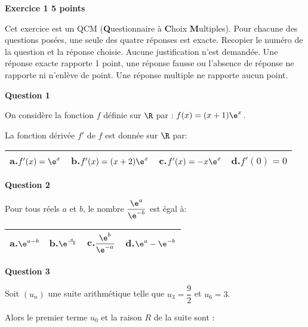 \textbf{\large Exercice 1 \hfill 5 points}

\bigskip

Cet exercice est un QCM (\textbf{Q}uestionnaire à \textbf{C}hoix \textbf{M}ultiples). Pour chacune des questions posées, une seule des quatre réponses est exacte. Recopier le numéro de la question et la réponse choisie. Aucune justification n'est demandée. Une réponse exacte rapporte 1 point, une réponse fausse ou l'absence de réponse ne rapporte ni n'enlève de point. Une réponse multiple ne rapporte aucun point.

\bigskip

\textbf{Question 1}

\medskip

On considère la fonction $f$ définie sur $\R$ par : $f(x)= (x+1)\e^{x}$.

La fonction dérivée $f'$ de $f$ est donnée sur $\R$ par:

\begin{center}
{\renewcommand{\arraystretch}{1.5}
\begin{tabularx}{\linewidth}{|X|X|X|X|}
\hline
\textbf{a.}\quad $f'(x)=\e^{x}$ & \textbf{b.}\quad $f'(x)=(x+2)\e^{x}$ 
& \textbf{c.}\quad $f'(x)=-x\e^{x}$   & \textbf{d.}\quad $f'(0)=0$\\
\hline
\end{tabularx}}
\end{center}

\medskip

\textbf{Question 2}

\medskip

Pour tous réels $a$ et $b$, le nombre $\dfrac{\e^{a}}{\e^{-b}}$ est égal à:

\begin{center}
{\renewcommand{\arraystretch}{1}
\begin{tabularx}{\linewidth}{|X|X|X|X|}
\hline
\textbf{a.}\quad $\e^{a-b}$ & \textbf{b.}\quad $\e^{\frac{a}{-b}}$ 
& \textbf{c.}\quad $\dfrac{\e^{b}}{\e^{-a}}$  \rule[-10pt]{0pt}{27pt} & \textbf{d.}\quad $\e^{a}-\e^{-b}$\\
\hline
\end{tabularx}}
\end{center}

\medskip

\textbf{Question 3}

\medskip

Soit $\left(u_n\right)$  une suite arithmétique telle que $u_3= \dfrac{9}{2}$ et $u_6=3$.

Alors le premier terme $u_0$ et la raison $R$ de la suite sont :

